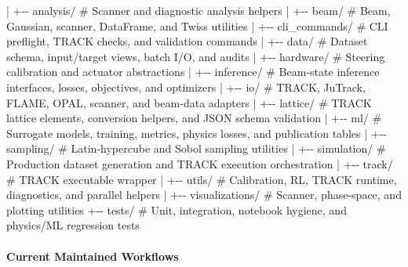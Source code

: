 \documentclass[
]{article}
\newenvironment{Shaded}{}{}
\newcommand{\NormalTok}[1]{#1}
\begin{document}
\begin{Shaded}
\begin{Highlighting}[]
\NormalTok{|   +{-}{-} analysis/               \# Scanner and diagnostic analysis helpers}
\NormalTok{|   +{-}{-} beam/                   \# Beam, Gaussian, scanner, DataFrame, and Twiss utilities}
\NormalTok{|   +{-}{-} cli\_commands/           \# CLI preflight, TRACK checks, and validation commands}
\NormalTok{|   +{-}{-} data/                   \# Dataset schema, input/target views, batch I/O, and audits}
\NormalTok{|   +{-}{-} hardware/               \# Steering calibration and actuator abstractions}
\NormalTok{|   +{-}{-} inference/              \# Beam{-}state inference interfaces, losses, objectives, and optimizers}
\NormalTok{|   +{-}{-} io/                     \# TRACK, JuTrack, FLAME, OPAL, scanner, and beam{-}data adapters}
\NormalTok{|   +{-}{-} lattice/                \# TRACK lattice elements, conversion helpers, and JSON schema validation}
\NormalTok{|   +{-}{-} ml/                     \# Surrogate models, training, metrics, physics losses, and publication tables}
\NormalTok{|   +{-}{-} sampling/               \# Latin{-}hypercube and Sobol sampling utilities}
\NormalTok{|   +{-}{-} simulation/             \# Production dataset generation and TRACK execution orchestration}
\NormalTok{|   +{-}{-} track/                  \# TRACK executable wrapper}
\NormalTok{|   +{-}{-} utils/                  \# Calibration, RL, TRACK runtime, diagnostics, and parallel helpers}
\NormalTok{|   +{-}{-} visualizations/         \# Scanner, phase{-}space, and plotting utilities}
\NormalTok{+{-}{-} tests/                      \# Unit, integration, notebook hygiene, and physics/ML regression tests}
\end{Highlighting}
\end{Shaded}

\hypertarget{current-maintained-workflows}{%
\paragraph{Current Maintained
Workflows}\label{current-maintained-workflows}}
\end{document}
